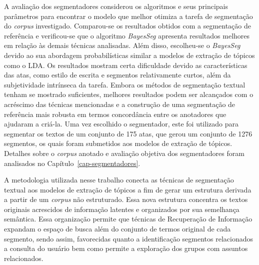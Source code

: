 A avaliação dos segmentadores considerou os algoritmos e seus principais parâmetros para encontrar o modelo que melhor otimiza a tarefa de segmentação do \textit{corpus} investigado. Comparou-se os resultados obtidos com a segmentação de referência e verificou-se que o algoritmo \textit{BayesSeg} apresenta resultados melhores em relação às demais técnicas analisadas. Além disso, escolheu-se o \textit{BayesSeg} devido ao sua abordagem probabilísticas similar a modelos de extração de tópicos como o LDA. 
Os resultados mostram certa dificuldade devido as características das atas, como estilo de escrita e segmentos relativamente curtos, além da subjetividade intrínseca da tarefa.
Embora os métodos de segmentação textual tenham se mostrado suficientes, melhores resultados podem ser alcançados com o acréscimo das técnicas mencionadas e a construção de uma segmentação de referência mais robusta em termos concordância entre os anotadores que ajudaram a criá-la.
Uma vez escolhido o segmentador, este foi utilizado para segmentar os textos de um conjunto de 175 atas, que gerou um conjunto de 1276 segmentos, os quais foram submetidos aos modelos de extração de tópicos.
Detalhes sobre o \textit{corpus} anotado e avaliação objetiva dos segmentadores foram analisados no Capítulo~\ref{cap-segmentadores}.




%
A metodologia utilizada nesse trabalho conecta as técnicas de segmentação textual aos modelos de extração de tópicos a fim de gerar um estrutura derivada a partir de um \textit{corpus} não estruturado. Essa nova estrutura concentra os textos originais acrescidos de informação latentes e organizados por sua semelhança semântica. Essa organização permite que técnicas de Recuperação de Informação expandam o espaço de busca além do conjunto de termos original de cada segmento, sendo assim, favorecidas quanto a identificação segmentos relacionados a consulta do usuário bem como permite a exploração dos grupos com assuntos relacionados.







